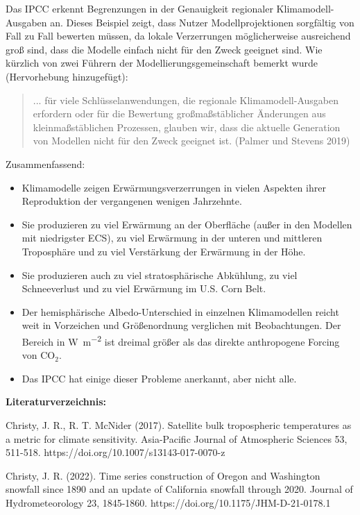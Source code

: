 \documentclass[12pt,paper=a4,DIV=12,parskip=never,chapterprefix=false,headings=standardclasses]{scrreprt}
\begin{document}
Das IPCC erkennt Begrenzungen in der Genauigkeit regionaler Klimamodell-Ausgaben an. Dieses Beispiel zeigt, dass Nutzer Modellprojektionen sorgfältig von Fall zu Fall bewerten müssen, da lokale Verzerrungen möglicherweise ausreichend groß sind, dass die Modelle einfach nicht für den Zweck geeignet sind. Wie kürzlich von zwei Führern der Modellierungsgemeinschaft bemerkt wurde (Hervorhebung hinzugefügt):
\begin{quote}
... für viele Schlüsselanwendungen, die regionale Klimamodell-Ausgaben erfordern oder für die Bewertung großmaßstäblicher Änderungen aus kleinmaßstäblichen Prozessen, glauben wir, dass die aktuelle Generation von Modellen nicht für den Zweck geeignet ist. (Palmer und Stevens 2019)
\end{quote}

Zusammenfassend:
\begin{itemize}
\item Klimamodelle zeigen Erwärmungsverzerrungen in vielen Aspekten ihrer Reproduktion der vergangenen wenigen Jahrzehnte.
\item  Sie produzieren zu viel Erwärmung an der Oberfläche (außer in den Modellen mit niedrigster ECS), zu viel Erwärmung in der unteren und mittleren Troposphäre und zu viel Verstärkung der Erwärmung in der Höhe.
\item  Sie produzieren auch zu viel stratosphärische Abkühlung, zu viel Schneeverlust und zu viel Erwärmung im U.S. Corn Belt.
\item  Der hemisphärische Albedo-Unterschied in einzelnen Klimamodellen reicht weit in Vorzeichen und Größenordnung verglichen mit Beobachtungen. Der Bereich in \si{\watt\per\square\meter} ist dreimal größer als das direkte anthropogene Forcing von CO$_2$.
\item  Das IPCC hat einige dieser Probleme anerkannt, aber nicht alle.
\end{itemize}

\vfill
\noindent\textbf{Literaturverzeichnis:}

\begingroup
\parindent=0pt
\everypar{\hangindent=2em\hangafter=1\relax}

Christy, J. R., R. T. McNider (2017). Satellite bulk tropospheric temperatures as a metric for climate
sensitivity. Asia-Pacific Journal of Atmospheric Sciences 53, 511-518.
https://doi.org/10.1007/s13143-017-0070-z

Christy, J. R. (2022). Time series construction of Oregon and Washington snowfall since 1890 and an
update of California snowfall through 2020. Journal of Hydrometeorology 23, 1845-1860.
https://doi.org/10.1175/JHM-D-21-0178.1
\end{document}
